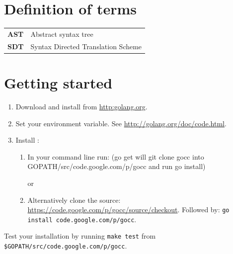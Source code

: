 \documentclass[12pt]{article}
\begin{document}
\section{Definition of terms}
	\begin{longtable}{ll}
		\bf AST & Abstract syntax tree\\
		\bf SDT	& Syntax Directed Translation Scheme \\
	\end{longtable}

\section{Getting started}
	\begin{enumerate}
		\item Download and install \Go from \url{http:golang.org}.

		\item Set your  environment variable. See \url{http://golang.org/doc/code.html}.

		\item Install \gocc:
			\begin{enumerate}
				\item In your command line run:  (go get will git clone gocc into GOPATH/src/code.google.com/p/gocc and run go install)

					or 

				\item Alternatively clone the source: \url{https://code.google.com/p/gocc/source/checkout}. Followed by:
				\verb|go install code.google.com/p/gocc|.
			\end{enumerate}

	\end{enumerate}

	Test your installation by running \verb|make test| from \verb|$GOPATH/src/code.google.com/p/gocc|.
\end{document}
